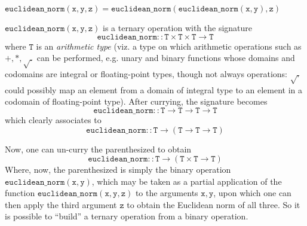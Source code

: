 \begin{Lemma}
    $\mathtt{euclidean\_norm(x, y, z) = euclidean\_norm(euclidean\_norm(x, y), z)}$
\end{Lemma}

\begin{solution}
    $\mathtt{euclidean\_norm(x, y, z)}$ is a ternary operation with the signature
    $$\mathtt{euclidean\_norm :: T \times T \times T \rightarrow T}$$
    where $\mathtt{T}$ is an \textit{arithmetic type} (viz. a type on which arithmetic operations such as
    $\mathtt{+, *, \sqrt{.}}$ can be performed, e.g. unary and binary functions whose domains and codomains
    are integral or floating-point types, though not always operations: $\mathtt{\sqrt{.}}$ could possibly
    map an element from a domain of integral type to an element in a codomain of floating-point type). After
    currying, the signature becomes
    $$\mathtt{euclidean\_norm :: T \rightarrow T \rightarrow T \rightarrow T}$$
    which clearly associates to
    $$\mathtt{euclidean\_norm :: T \rightarrow \left(T \rightarrow T \rightarrow T\right)}$$

    Now, one can un-curry the parenthesized to obtain
    $$\mathtt{euclidean\_norm :: T \rightarrow \left(T \times T \rightarrow T\right)}$$
    Where, now, the parenthesized is simply the binary operation $\mathtt{euclidean\_norm(x, y)}$, which may
    be taken as a partial application of the function $\mathtt{euclidean\_norm(x,y,z)}$ to the arguments
    $\mathtt{x, y}$, upon which one can then apply the third argument $\mathtt{z}$ to obtain the Euclidean norm
    of all three. So it is possible to \enquote{build} a ternary operation from a binary operation.
\end{solution}